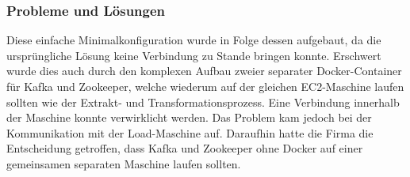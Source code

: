 \subsubsection{Probleme und Lösungen}
Diese einfache Minimalkonfiguration wurde in Folge dessen aufgebaut, da die ursprüngliche Lösung keine Verbindung zu Stande bringen konnte. Erschwert wurde dies auch durch den komplexen Aufbau zweier separater Docker-Container
für Kafka und Zookeeper, welche wiederum auf der gleichen EC2-Maschine laufen sollten wie der Extrakt- und Transformationsprozess. Eine Verbindung innerhalb der Maschine konnte verwirklicht werden. Das Problem kam jedoch bei der Kommunikation mit der Load-Maschine auf. Daraufhin hatte die Firma die Entscheidung getroffen, dass Kafka und Zookeeper ohne Docker auf einer gemeinsamen separaten Maschine laufen sollten.
